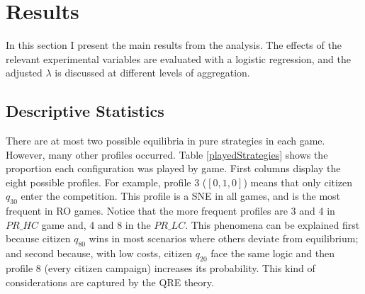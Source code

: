\chapter{Results}\label{chap:res}

In this section I present the main results from the analysis. The effects of the relevant experimental variables are evaluated with a logistic regression, and the adjusted $\lambda$ is discussed at different levels of aggregation.

\section{Descriptive Statistics}


There are at most two possible equilibria in pure strategies in each game. However, many other profiles occurred. 
Table \ref{playedStrategies} shows the proportion each configuration was played by game.
First columns display the eight possible profiles. For example, profile 3 ($[0, 1, 0]$) means that only citizen $q_{30}$ enter the competition. 
This profile is a SNE in all games, and is the most frequent in RO games.
Notice that the more frequent profiles are 3 and 4 in $PR\_HC$ game and, 4 and 8 in the $PR\_LC$.
This phenomena can be explained first because citizen $q_{80}$ wins in most scenarios where others deviate from equilibrium; and second because, with low costs, citizen $q_{20}$ face the same logic and then profile 8 (every citizen campaign) increases its probability. %
This kind of considerations are captured by the QRE theory. 

